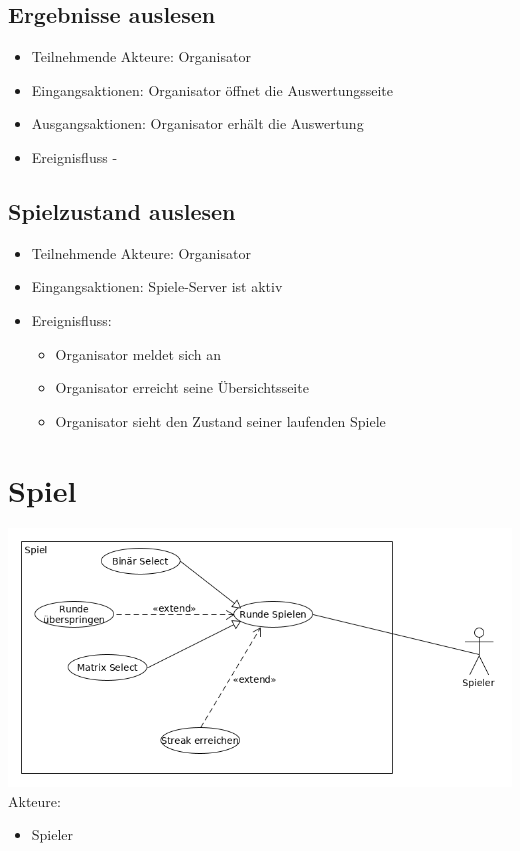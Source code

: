 \documentclass[a4paper]{scrreprt}
\begin{document}
    \subsection{Ergebnisse auslesen}

    \begin{itemize}
        \item Teilnehmende Akteure: \Gls{Organisator}
        \item Eingangsaktionen: \Gls{Organisator} öffnet die Auswertungsseite
        \item Ausgangsaktionen: \Gls{Organisator} erhält die Auswertung
        \item Ereignisfluss -
    \end{itemize}
 \subsection{Spielzustand auslesen}
	\begin{itemize}
		\item Teilnehmende Akteure: \Gls{Organisator}
		\item Eingangsaktionen: Spiele-Server ist aktiv
		\item Ereignisfluss:
		\begin{itemize}
			\item Organisator meldet sich an
			\item Organisator erreicht seine Übersichtsseite
			\item Organisator sieht den Zustand seiner laufenden Spiele
		\end{itemize}
	\end{itemize}


    \newpage
    \section{Spiel}
    \includegraphics[width=\textwidth]{uml/export/Spiel.png}
    Akteure: 
    \begin{itemize}
    \item \Gls{Spieler}
    \newpage
    \end{itemize}
    
\end{document}
